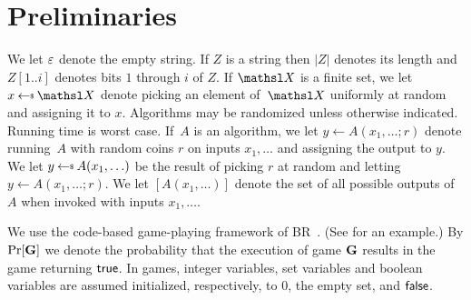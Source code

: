 

\section{Preliminaries}\label{sec-defs}


We let $\varepsilon$ denote the empty string. If $Z$ is a string then $|Z|$ denotes its length and $Z[1..i]$ denotes bits $1$ through $i$ of $Z$. If $\setX$ is a finite set, we let $x \getsr \setX$ denote picking an element of~$\setX$ uniformly at random and assigning it to $x$.
Algorithms may be randomized unless otherwise indicated. Running time is worst case.
If~$A$ is an algorithm, we let $y \gets A(x_1,\ldots;r)$ denote running~$A$ with random coins $r$ on inputs $x_1,\ldots$ and assigning the output to $y$.
We let $y \getsr A(x_1,\ldots)$ be the result of picking $r$ at random and letting $y \gets A(x_1,\ldots;r)$. We let $[A(x_1,\ldots)]$ denote the set of all possible outputs of $A$ when invoked with inputs $x_1,\ldots$.

We use the code-based game-playing framework of BR~\cite{EC:BelRog06}. (See  for an example.) By $\Pr[\mathbf{G}]$ we denote the probability that the execution of game $\mathbf{G}$ results in the game returning $\mathsf{true}$. In games, integer variables, set variables and boolean variables are assumed initialized, respectively, to $0$, the empty set, and $\mathsf{false}$.

